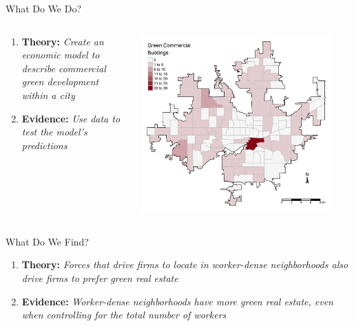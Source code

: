 \documentclass[11pt, dvipsnames, usenames, aspectratio=169]{beamer}
\begin{document}
\begin{frame}{What Do We Do?}

\begin{columns}
\begin{column}{.48\textwidth}

\begin{enumerate}
	\item \textbf{Theory:} \textit{Create an economic model to describe commercial green development within a city}
	
	\vspace{1.5cm}
	\item \textbf{Evidence:} \textit{Use data to test the model's predictions}
\end{enumerate}

\end{column}
\begin{column}{.5\textwidth}\centering
{}
\includegraphics[width = 0.9\textwidth]{0001.jpg}
\end{column}
\end{columns}

\end{frame} 

\begin{frame}{What Do We Find?}

\begin{enumerate}
	\item \textbf{Theory:} \textit{Forces that drive firms to locate in worker-dense neighborhoods also drive firms to prefer green real estate }
	
	\vfill
	\item \textbf{Evidence:} \textit{Worker-dense neighborhoods have more green real estate, even when controlling for the total number of workers}
\end{enumerate}

\end{frame}
\end{document}
